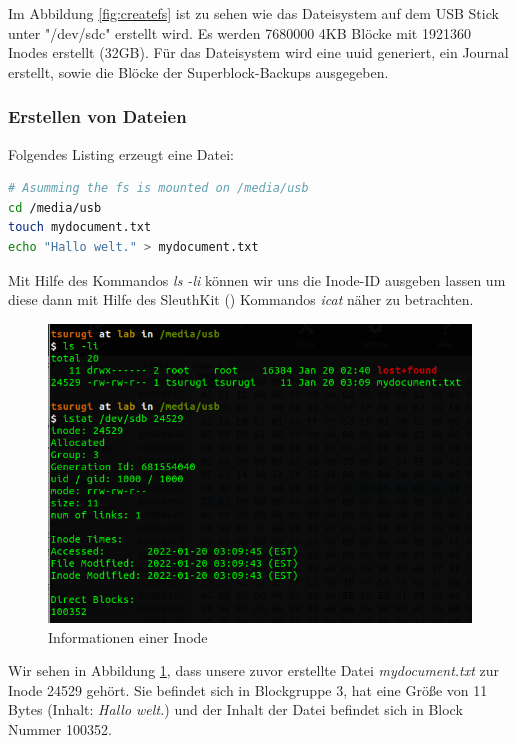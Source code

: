 Im Abbildung \ref{fig:createfs} ist zu sehen wie das Dateisystem auf dem USB Stick unter "/dev/sdc" erstellt wird. Es werden 7680000 4KB Blöcke mit 1921360 Inodes erstellt (32GB). Für das Dateisystem wird eine \ac{uuid} generiert, ein Journal erstellt, sowie die Blöcke der Superblock-Backups ausgegeben.


\subsubsection{Erstellen von Dateien}

Folgendes Listing erzeugt eine Datei:

\begin{lstlisting}[language=bash]
# Asumming the fs is mounted on /media/usb
cd /media/usb
touch mydocument.txt
echo "Hallo welt." > mydocument.txt
\end{lstlisting} 

Mit Hilfe des Kommandos \textit{ls -li} können wir uns die Inode-ID ausgeben lassen um diese dann mit Hilfe des SleuthKit (\cite{Sleuthkit.07.01.2022}) Kommandos \textit{icat} näher zu betrachten.

\begin{figure}[H]
	\centering
	\includegraphics[width=12cm,keepaspectratio=true]{pictures/inode-stats.png}
	\caption{
		Informationen einer Inode
	}
	\label{fig:inodestats}
\end{figure}

Wir sehen in Abbildung \ref{fig:inodestats}, dass unsere zuvor erstellte Datei \textit{mydocument.txt} zur Inode 24529 gehört. Sie befindet sich in Blockgruppe 3, hat eine Größe von 11 Bytes (Inhalt: \textit{Hallo welt.}) und der Inhalt der Datei befindet sich in Block Nummer 100352.

